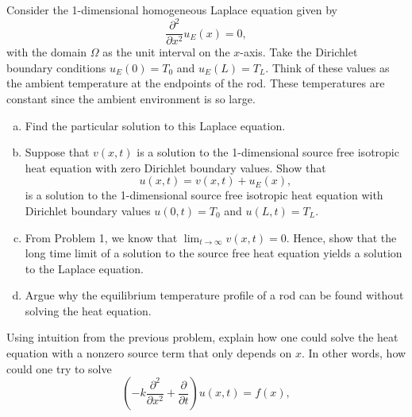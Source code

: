 \documentclass[12pt]{article} %
\begin{document}
\begin{problem}
    Consider the 1-dimensional homogeneous Laplace equation given by 
    \[
    \frac{\partial^2}{\partial x^2} u_E(x) = 0,
    \]
    with the domain $\Omega$ as the unit interval on the $x$-axis.  Take the Dirichlet boundary conditions $u_E(0)=T_0$ and $u_E(L)=T_L$.  Think of these values as the ambient temperature at the endpoints of the rod.  These temperatures are constant since the ambient environment is so large.
    \begin{enumerate}[(a)]
        \item Find the particular solution to this Laplace equation.
        \item Suppose that $v(x,t)$ is a solution to the 1-dimensional source free isotropic heat equation with zero Dirichlet boundary values. Show that 
        \[
        u(x,t)=v(x,t)+u_E(x),
        \]  
        is a solution to the 1-dimensional source free isotropic heat equation with Dirichlet boundary values $u(0,t)=T_0$ and $u(L,t)=T_L$.
        \item From Problem 1, we know that $\lim_{t\to \infty} v(x,t) = 0$.  Hence, show that the long time limit of a solution to the source free heat equation yields a solution to the Laplace equation.
        \item Argue why the equilibrium temperature profile of a rod can be found without solving the heat equation.
    \end{enumerate}
\end{problem}

\begin{problem}
    Using intuition from the previous problem, explain how one could solve the heat equation with a nonzero source term that only depends on $x$. In other words, how could one try to solve
    \[
    \left( -k \frac{\partial^2}{\partial x^2} + \frac{\partial}{\partial t} \right) u(x,t) = f(x),
    \]
\end{problem}
\end{document}
